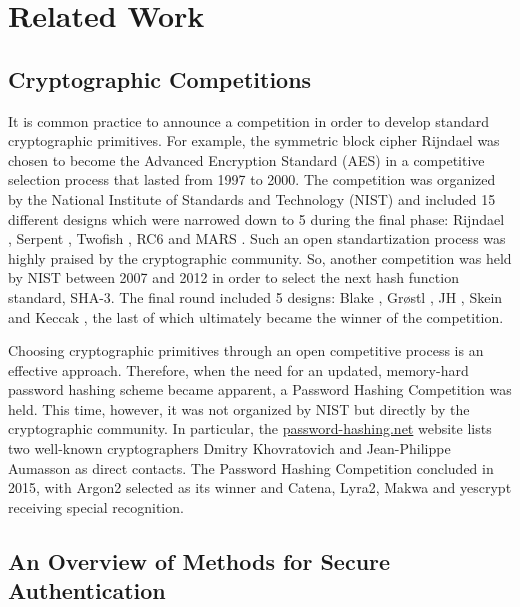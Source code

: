 \chapter{Related Work}
\label{chapter:related-work}

\section{Cryptographic Competitions}
\label{sec:cryptocomps}

It is common practice to announce a competition in order to develop standard cryptographic primitives. For example, the symmetric block cipher Rijndael \cite{daemen:2002:DRA} was chosen to become the Advanced Encryption Standard (AES) \cite{aes-fips} in a competitive selection process that lasted from 1997 to 2000. The competition was organized by the National Institute of Standards and Technology (NIST) and included 15 different designs which were narrowed down to 5 during the final phase: Rijndael \cite{daemen:2002:DRA}, Serpent \cite{anderson:1988:serpent}, Twofish \cite{schneier:1998:twofish}, RC6 \cite{rivest:1998:rc6} and MARS \cite{burwick:1998:mars}. Such an open standartization process was highly praised by the cryptographic community. So, another competition was held by NIST between 2007 and 2012 in order to select the next hash function standard, SHA-3. The final round included 5 designs: Blake \cite{aumasson:2013:blake2}, Grøstl \cite{praveen:2011:groestl}, JH \cite{wu:2011:jh}, Skein \cite{ferguson:2009:skein} and Keccak \cite{cryptoeprint:2015:keccak}, the last of which ultimately became the winner of the competition.

Choosing cryptographic primitives through an open competitive process is an effective approach. Therefore, when the need for an updated, memory-hard password hashing scheme became apparent, a Password Hashing Competition was held. This time, however, it was not organized by NIST but directly by the cryptographic community. In particular, the \url{password-hashing.net} website lists two well-known cryptographers Dmitry Khovratovich and Jean-Philippe Aumasson as direct contacts. The Password Hashing Competition concluded in 2015, with Argon2 selected as its winner and Catena, Lyra2, Makwa and yescrypt receiving special recognition.

\section{An Overview of Methods for Secure Authentication}
\label{sec:secure-authentication}

